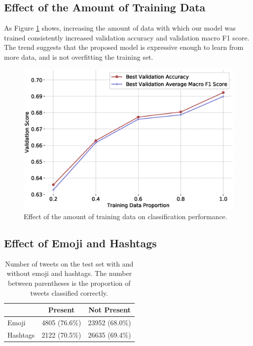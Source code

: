 \documentclass[11pt,a4paper]{article}
\begin{document}
\subsection{Effect of the Amount of Training Data}

As Figure \ref{fig:data_amt_vs_acc} shows, increasing the amount of data with
which our model was trained consistently increased validation accuracy and
validation macro F1 score. The trend suggests that the proposed model is
expressive enough to learn from more data, and is not overfitting the training
set. 

\begin{figure}[!h]
    \centering
    \includegraphics[width=\columnwidth]{images/acc_vs_tdp_variation.eps}
    \caption{Effect of the amount of training data on classification performance.}
    \label{fig:data_amt_vs_acc}
\end{figure}

\subsection{Effect of Emoji and Hashtags}%
\label{sub:effect_of_emoji_and_hashtags}

\begin{table}[!h]
    \centering
    \footnotesize

    \begin{tabular}{lcc}

        \toprule
        \textbf{} & \textbf{Present} & \textbf{Not Present} \\
        \midrule
        Emoji     & 4805 (76.6\%)    & 23952 (68.0\%)       \\
        Hashtags  & 2122 (70.5\%)    & 26635 (69.4\%)       \\
        \bottomrule

    \end{tabular}

    \caption{Number of tweets on the test set with and without emoji and
    hashtags. The number between parentheses is the proportion of tweets
    classified correctly.}

    \label{table:emoji_and_hashtags}

\end{table}
\end{document}

